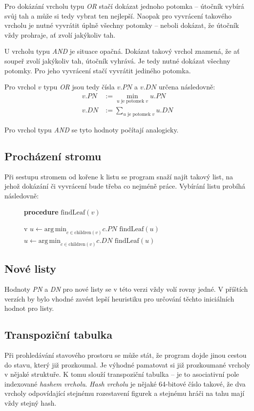 \documentclass{article}
\begin{document}
Pro dokázání vrcholu typu \emph{OR} stačí dokázat jednoho potomka -- útočník vybírá svůj tah a může si tedy vybrat
ten nejlepší. Naopak pro vyvrácení takového vrcholu je nutné vyvrátit úplně všechny potomky -- neboli dokázat, že
útočník vždy prohraje, ať zvolí jakýkoliv tah.

U vrcholu typu \emph{AND} je situace opačná. Dokázat takový vrchol znamená, že ať soupeř zvolí jakýkoliv tah, útočník
vyhrává. Je tedy nutné dokázat všechny potomky. Pro jeho vyvrácení stačí vyvrátit jediného potomka.

Pro vrchol $v$ typu \emph{OR} jsou tedy čísla $v.PN$ a $v.DN$ určena následovně:
\begin{align*}
	v.PN &:= \min_{u \text{ je potomek $v$}} u.PN \\
	v.DN &:= \sum_{u \text{ je potomek $v$}} u.DN
\end{align*}

Pro vrchol typu \emph{AND} se tyto hodnoty počítají analogicky.

\subsection{Procházení stromu}
Při sestupu stromem od kořene k listu se program snaží najít takový list, na jehož dokázání či vyvrácení bude třeba co
nejméně práce. Vybírání listu probíhá následovně:

\begin{figure}[H]
{\bf procedure} $\text{findLeaf}(v)$
\begin{algorithmic}
		 v
		\STATE $u \gets \mathrm{arg\, min}_{c \in \mathrm{children}(v)} c.PN$
		 $\text{findLeaf}(u)$
	\ELSE
		\STATE $u \gets \mathrm{arg\, min}_{c \in \mathrm{children}(v)} c.DN$
		 $\text{findLeaf}(u)$
	\ENDIF
\end{algorithmic}
\end{figure}

\subsection{Nové listy}
Hodnoty \emph{PN} a \emph{DN} pro nové listy se v této verzi vždy volí rovny jedné. V příštích verzích by bylo vhodné
zavést lepší heuristiku pro určování těchto iniciálních hodnot pro listy.

\subsection{Transpoziční tabulka}
Při prohledávání stavového prostoru se může stát, že program dojde jinou cestou do stavu, který již prozkoumal. Je
výhodné pamatovat si již prozkoumané vrcholy v nějaké struktuře. K tomu slouží transpoziční tabulka -- je to asociativní
pole indexované \emph{hashem vrcholu}. \emph{Hash vrcholu} je nějaké 64-bitové číslo takové, že dva vrcholy odpovídající
stejnému rozestavení figurek a stejnému hráči na tahu mají vždy stejný hash.
\end{document}
